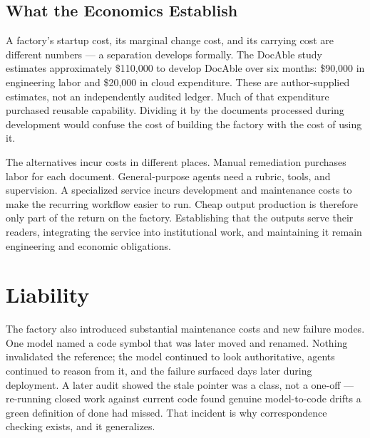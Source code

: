 \subsection{What the Economics Establish}\label{heading:what-the-economics-establish}


A factory's startup cost, its marginal change cost, and its carrying cost are different numbers --- a separation  develops formally. The DocAble study estimates approximately \$110,000 to develop DocAble over six months: \$90,000 in engineering labor and \$20,000 in cloud expenditure. These are author-supplied estimates, not an independently audited ledger\citep{davis2026docable}. Much of that expenditure purchased reusable capability. Dividing it by the documents processed during development would confuse the cost of building the factory with the cost of using it.


The alternatives incur costs in different places. Manual remediation purchases labor for each document. General-purpose agents need a rubric, tools, and supervision. A specialized service incurs development and maintenance costs to make the recurring workflow easier to run. Cheap output production is therefore only part of the return on the factory. Establishing that the outputs serve their readers, integrating the service into institutional work, and maintaining it remain engineering and economic obligations.

\section{Liability}\label{heading:liability}



The factory also introduced substantial maintenance costs and new failure modes. One model named a code symbol that was later moved and renamed. Nothing invalidated the reference; the model continued to look authoritative, agents continued to reason from it, and the failure surfaced days later during deployment. A later audit showed the stale pointer was a class, not a one-off --- re-running closed work against current code found genuine model-to-code drifts a green definition of done had missed. That incident is why correspondence checking exists, and it generalizes.

